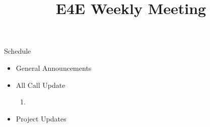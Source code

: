 \documentclass[aspectratio=169]{beamer}
\title{E4E Weekly Meeting}
\institute{UC San Diego}
\begin{document}
\maketitle
\begin{frame}{Schedule}
    \begin{itemize}
        \item General Announcements
        \item All Call Update
        \begin{enumerate}
            \item 
        \end{enumerate}
        \item Project Updates
        \begin{enumerate}
            
        \end{enumerate}
    \end{itemize}
\end{frame}

\end{document}
